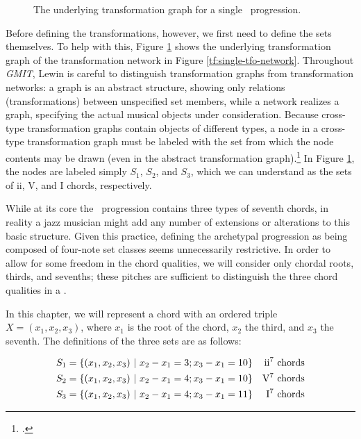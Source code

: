 \begin{figure}[htbp]
  \caption{The underlying transformation graph for a single \tfo\ progression.}
  \label{tf:single-tfo-graph}
\end{figure}

Before defining the transformations, however, we first need to define the sets
themselves. To help with this, Figure \ref{tf:single-tfo-graph} shows the
underlying transformation graph of the transformation network in Figure
\ref{tf:single-tfo-network}. Throughout \emph{GMIT}, Lewin is careful to
distinguish transformation graphs from transformation networks: a graph is an
abstract structure, showing only relations (transformations) between
unspecified set members, while a network realizes a graph, specifying the
actual musical objects under consideration. Because cross-type
transformation graphs contain objects of different types, a node in a
cross-type transformation graph must be labeled with the set from which the
node contents may be drawn (even in the abstract transformation
graph).\footcite[7]{hook:2007} In Figure \ref{tf:single-tfo-graph}, the nodes
are labeled simply $S_1$, $S_2$, and $S_3$, which we can understand as the
sets of ii, V, and I chords, respectively.

While at its core the \tfo\ progression contains three types of seventh
chords, in reality a jazz musician might add any number of extensions or
alterations to this basic structure. Given this practice, defining the
archetypal progression as being composed of four-note set classes seems
unnecessarily restrictive. In order to allow for some freedom in the chord
qualities, we will consider only chordal roots, thirds, and sevenths; these
pitches are sufficient to distinguish the three chord qualities in a \tfo.

In this chapter, we will represent a chord with an ordered triple $X = (x_1,
x_2, x_3)$, where $x_1$ is the root of the chord, $x_2$ the third, and $x_3$
the seventh. The definitions of the three sets are as follows:

\vspace{-3em} %
\begin{align*}
  S_1 &= \{ (x_1, x_2, x_3)\ |\ x_2 - x_1 = 3; x_3 - x_1 = 10 \} &
    \text{ii\tsup{7} chords} \\ %
  S_2 &= \{ (x_1, x_2, x_3)\ |\ x_2 - x_1 = 4; x_3 - x_1 = 10 \} &
    \text{V\tsup{7} chords} \\ %
  S_3 &= \{ (x_1, x_2, x_3)\ |\ x_2 - x_1 = 4; x_3 - x_1 = 11 \} &
    \text{I\tsup{7} chords}
\end{align*}
\vspace{-3em}

